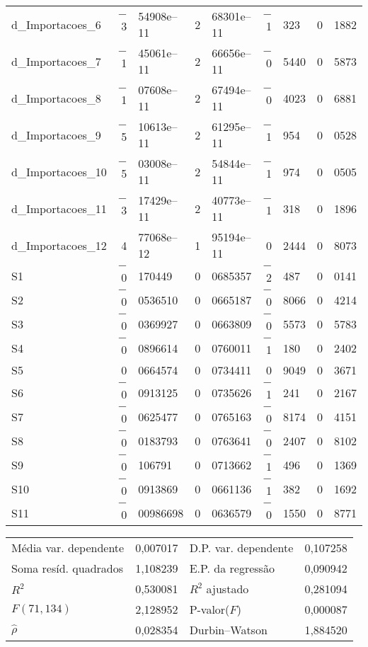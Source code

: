 \documentclass[11pt]{article}
\begin{document}
\begin{center}
\begin{tabular}{lr@{,}lr@{,}lr@{,}lr@{,}l}
d\_Importacoes\_6 &
  $-$3&54908\textrm{e--11} &
    2&68301\textrm{e--11} &
      $-$1&323 &
        0&1882 \\
d\_Importacoes\_7 &
  $-$1&45061\textrm{e--11} &
    2&66656\textrm{e--11} &
      $-$0&5440 &
        0&5873 \\
d\_Importacoes\_8 &
  $-$1&07608\textrm{e--11} &
    2&67494\textrm{e--11} &
      $-$0&4023 &
        0&6881 \\
d\_Importacoes\_9 &
  $-$5&10613\textrm{e--11} &
    2&61295\textrm{e--11} &
      $-$1&954 &
        0&0528 \\
d\_Importacoes\_10 &
  $-$5&03008\textrm{e--11} &
    2&54844\textrm{e--11} &
      $-$1&974 &
        0&0505 \\
d\_Importacoes\_11 &
  $-$3&17429\textrm{e--11} &
    2&40773\textrm{e--11} &
      $-$1&318 &
        0&1896 \\
d\_Importacoes\_12 &
  4&77068\textrm{e--12} &
    1&95194\textrm{e--11} &
      0&2444 &
        0&8073 \\
S1 &
  $-$0&170449 &
    0&0685357 &
      $-$2&487 &
        0&0141 \\
S2 &
  $-$0&0536510 &
    0&0665187 &
      $-$0&8066 &
        0&4214 \\
S3 &
  $-$0&0369927 &
    0&0663809 &
      $-$0&5573 &
        0&5783 \\
S4 &
  $-$0&0896614 &
    0&0760011 &
      $-$1&180 &
        0&2402 \\
S5 &
  0&0664574 &
    0&0734411 &
      0&9049 &
        0&3671 \\
S6 &
  $-$0&0913125 &
    0&0735626 &
      $-$1&241 &
        0&2167 \\
S7 &
  $-$0&0625477 &
    0&0765163 &
      $-$0&8174 &
        0&4151 \\
S8 &
  $-$0&0183793 &
    0&0763641 &
      $-$0&2407 &
        0&8102 \\
S9 &
  $-$0&106791 &
    0&0713662 &
      $-$1&496 &
        0&1369 \\
S10 &
  $-$0&0913869 &
    0&0661136 &
      $-$1&382 &
        0&1692 \\
S11 &
  $-$0&00986698 &
    0&0636579 &
      $-$0&1550 &
        0&8771 \\
\end{tabular}

\vspace{1ex}
\begin{tabular}{lrlr}
Média var. dependente &  0,007017 & D.P. var. dependente &  0,107258 \\
Soma resíd. quadrados &  1,108239 & E.P. da regressão &  0,090942 \\
$R^2$ &  0,530081 & $R^2$ ajustado &  0,281094 \\
$F(71, 134)$ &  2,128952 & P-valor($F$) &  0,000087 \\
$\hat{\rho}$ &  0,028354 & Durbin--Watson &  1,884520 \\
\end{tabular}


\end{center}
\end{document}
